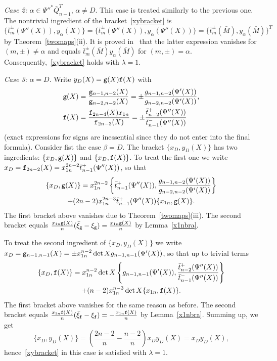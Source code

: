 \documentclass{amsart}
\theoremstyle{definition}
\theoremstyle{remark}
\numberwithin{equation}{section}
\numberwithin{theorem}{section}
\def\ef{{\tt f}}
\def\eg{{\tt g}}
\begin{document}
{\it Case 2:\/} $\alpha\in\Psi''^*\bar Q_{n-1}^T$, $\alpha\ne D$. This case is treated similarly to the previous one. The nontrivial ingredient of the bracket~\eqref{xybracket} is
\[
\{\bar t_m^\pm (\Psi''(X)),y_\alpha(X)\}=\{\bar t_m^\pm (\Psi''(X)),y_\alpha(\Psi''(X))\}=\{\bar t_m^\pm(\bar M),y_\alpha(\bar M)\}^T
\]
by Theorem~\ref{twomaps}(ii). It is proved in~\cite[Lemma 5.1]{GSV_Acta} that the latter expression
vanishes for $(m,\pm)\ne\alpha$ and equals $\bar t_m^\pm (\bar M)y_\alpha(\bar M)$ for $(m,\pm)=\alpha$. Consequently,~\eqref{xybracket} holds with $\lambda=1$.

{\it Case 3:\/} $\alpha=D$. Write $y_D(X)=\eg(X)\ef(X)$ with
\begin{align*}
\eg(X)&=\frac{\eg_{n-1,n-2}(X)}{\eg_{n-2,n-2}(X)}=\pm\frac{g_{n-1,n-2}(\Psi'(X))}{g_{n-2,n-2}(\Psi'(X))},\\
\ef(X)&=\frac{\ef_{2n-4}(X)x_{1n}}{\ef_{2n-3}(X)}=\pm\frac{\bar t^+_{n-2}(\Psi''(X))}{\bar t^-_{n-1}(\Psi''(X))}
\end{align*}
(exact expressions for signs are inessential since they do not enter into the final formula). 
Consider fist the case $\beta=D$. 
The bracket $\{x_D,y_D(X)\}$ has two ingredients: $\{x_D,\eg(X)\}$ and $\{x_D,\ef(X)\}$. To treat the first one we write
$x_D=\ef_{2n-2}(X)=x_{1n}^{2n-2}\bar t^+_{n-1}(\Psi''(X))$, so that
\begin{multline*}
\{x_D,\eg(X)\}=x_{1n}^{2n-2}\left\{\bar t^+_{n-1}(\Psi''(X)), \frac{g_{n-1,n-2}(\Psi'(X))}{g_{n-2,n-2}(\Psi'(X))}\right\}
\\+(2n-2)x_{1n}^{2n-3}\bar t^+_{n-1}(\Psi''(X))\{x_{1n},\eg(X)\}.
\end{multline*}
The first bracket above vanishes due to Theorem~\ref{twomaps}(iii). The second bracket equals $\frac{x_{1n}\eg(X)}n
(\bar\xi_\eg-\xi_\eg)=\frac{x_{1n}\eg(X)}n$ by Lemma~\ref{x1nbra}. 

To treat the second ingredient of $\{x_D,y_D(X)\}$ we write
$x_D=\eg_{n-1,n-1}(X)=\pm x_{1n}^{n-2}\det Xg_{n-1,n-1}(\Psi'(X))$, so that up to trivial terms
\begin{multline*}
\{x_D,\ef(X)\}=x_{1n}^{n-2}\det X\left\{g_{n-1,n-1}(\Psi'(X)),\frac{\bar t^+_{n-2}(\Psi''(X))}
{\bar t^-_{n-1}(\Psi''(X))}\right\}\\
+(n-2)x_{1n}^{n-3}\det X\{x_{1n},\ef(X)\}.
\end{multline*}
The first bracket above vanishes for the same reason as before. The second bracket equals $\frac{x_{1n}\ef(X)}n
(\bar\xi_\ef-\xi_\ef)=-\frac{x_{1n}\ef(X)}n$ by Lemma~\ref{x1nbra}. Summing up, we get
\[
\{x_D,y_D(X)\}=\left(\frac{2n-2}n-\frac{n-2}n\right)x_Dy_D(X)=x_Dy_D(X),
\]
hence~\eqref{xybracket} in this case is satisfied with $\lambda=1$.
\end{document}
